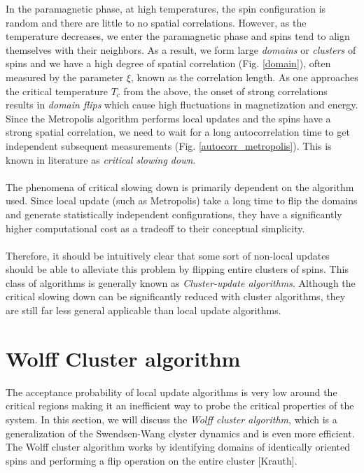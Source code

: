 \documentclass[../journal_main.tex]{subfiles}
\begin{document}
\!\!\!In the paramagnetic phase, at high temperatures, the spin configuration is random and there are little to no spatial correlations. However, as the temperature decreases, we enter the paramagnetic phase and spins tend to align themselves with their neighbors. As a result, we form large \textit{domains} or \textit{clusters} of spins and we have a high degree of spatial correlation (Fig. \ref{domain}), often measured by the parameter $\xi$, known as the correlation length. As one approaches the critical temperature $T_c$ from the above, the onset of strong correlations results in \textit{domain flips} which cause high fluctuations in magnetization and energy. Since the Metropolis algorithm performs local updates and the spins have a strong spatial correlation, we need to wait for a long autocorrelation time to get independent subsequent measurements (Fig. \ref{autocorr_metropolis}). This is known in literature as \textit{critical slowing down}.~\\~\\
The phenomena of critical slowing down is primarily dependent on the algorithm used. Since local update (such as Metropolis) take a long time to flip the domains and generate statistically independent configurations, they have a significantly higher computational cost as a tradeoff to their conceptual simplicity.~\\~\\
Therefore, it should be intuitively clear that some sort of non-local updates should be able to alleviate this problem by flipping entire clusters of spins. This class of algorithms is generally known as \textit{Cluster-update algorithms}. Although the critical slowing down can be significantly reduced with cluster algorithms, they are still far less general applicable than local update algorithms.

\section{Wolff Cluster algorithm}
The acceptance probability of local update algorithms is very low around the critical regions making it an inefficient way to probe the critical properties of the system. In this section, we will discuss the \textit{Wolff cluster algorithm}, which is a generalization of the Swendsen-Wang clyster dynamics and is even more efficient. The Wolff cluster algorithm works by identifying domains of identically oriented spins and performing a flip operation on the entire cluster [Krauth].
\end{document}
